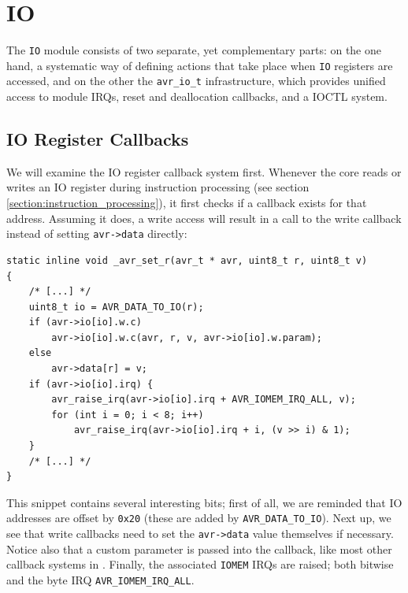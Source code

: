 \section{\acf{IO}}

The \lstinline|IO| module consists of two separate, yet complementary parts: on the one hand,
a systematic way of defining actions that take place when \lstinline|IO| registers
are accessed, and on the other the \lstinline|avr_io_t| infrastructure, which
provides unified access to module \acp{IRQ}, reset and deallocation callbacks,
and a \ac{IOCTL} system.

\subsection{\acf{IO} Register Callbacks} \label{subsection:io_register_callbacks}

We will examine the \ac{IO} register callback system first. Whenever the \simavr
core reads or writes an \ac{IO} register during instruction processing (see section
\ref{section:instruction_processing}), it first checks if a callback exists for
that address. Assuming it does, a write access will result in a call to the
write callback instead of setting \lstinline|avr->data| directly:

\begin{lstlisting}
static inline void _avr_set_r(avr_t * avr, uint8_t r, uint8_t v)
{
    /* [...] */
    uint8_t io = AVR_DATA_TO_IO(r);
    if (avr->io[io].w.c)
        avr->io[io].w.c(avr, r, v, avr->io[io].w.param);
    else
        avr->data[r] = v;
    if (avr->io[io].irq) {
        avr_raise_irq(avr->io[io].irq + AVR_IOMEM_IRQ_ALL, v);
        for (int i = 0; i < 8; i++)
            avr_raise_irq(avr->io[io].irq + i, (v >> i) & 1);
    }
    /* [...] */
}
\end{lstlisting}

This snippet contains several interesting bits; first of all, we are reminded that \ac{IO}
addresses are offset by \lstinline|0x20| (these are added by \lstinline|AVR_DATA_TO_IO|).
Next up, we see that write callbacks need to set the \lstinline|avr->data| value
themselves if necessary. Notice also that a custom parameter is passed into the callback,
like most other callback systems in \simavr. Finally, the associated \lstinline|IOMEM| \acp{IRQ} are
raised; both bitwise and the byte \ac{IRQ} \lstinline|AVR_IOMEM_IRQ_ALL|.

